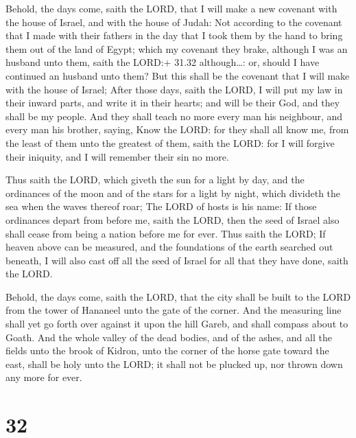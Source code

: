  Behold, the days come, saith the LORD, that I will make
a new covenant with the house of Israel, and with the house of Judah:
 Not according to the covenant that I made with their
fathers in the day that I took them by the hand to bring them out of the
land of Egypt; which my covenant they brake, although I was an husband
unto them, saith the LORD:+ 31.32 although\ldots: or, should I have
continued an husband unto them?  But this shall be the
covenant that I will make with the house of Israel; After those days,
saith the LORD, I will put my law in their inward parts, and write it in
their hearts; and will be their God, and they shall be my people.
 And they shall teach no more every man his neighbour, and
every man his brother, saying, Know the LORD: for they shall all know
me, from the least of them unto the greatest of them, saith the LORD:
for I will forgive their iniquity, and I will remember their sin no
more.

 Thus saith the LORD, which giveth the sun for a light by
day, and the ordinances of the moon and of the stars for a light by
night, which divideth the sea when the waves thereof roar; The LORD of
hosts is his name:  If those ordinances depart from before
me, saith the LORD, then the seed of Israel also shall cease from being
a nation before me for ever.  Thus saith the LORD; If
heaven above can be measured, and the foundations of the earth searched
out beneath, I will also cast off all the seed of Israel for all that
they have done, saith the LORD.

 Behold, the days come, saith the LORD, that the city
shall be built to the LORD from the tower of Hananeel unto the gate of
the corner.  And the measuring line shall yet go forth over
against it upon the hill Gareb, and shall compass about to Goath.
 And the whole valley of the dead bodies, and of the ashes,
and all the fields unto the brook of Kidron, unto the corner of the
horse gate toward the east, shall be holy unto the LORD; it shall not be
plucked up, nor thrown down any more for ever.

\hypertarget{section-31}{%
\section{32}\label{section-31}}

